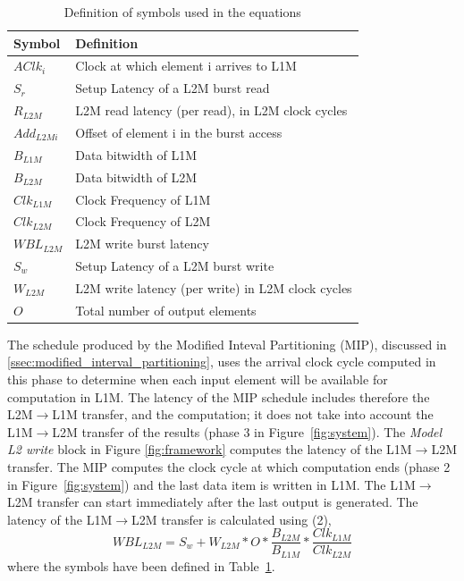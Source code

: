 \begin{table}[]
\centering
\footnotesize
\begin{tabular}{|l|l|}
\hline
\textbf{Symbol} & \textbf{Definition}                                           \\ \hline
$AClk_i$           & Clock at which element i arrives to L1M                \\
$S_r$             & Setup Latency of a L2M burst read                          \\
$R_{L2M}$       & L2M read latency (per read), in L2M clock cycles   \\
$Add_{L2Mi}$     & Offset of element i in the burst access \\
$B_{L1M}$        & Data bitwidth of L1M                                       \\
$B_{L2M}$        & Data bitwidth of L2M                                       \\
$Clk_{L1M}$      & Clock Frequency of L1M                                     \\
$Clk_{L2M}$      & Clock Frequency of L2M                                     \\
$WBL_{L2M}$      & L2M write burst latency                                    \\
$S_w$             & Setup Latency of a L2M burst write                         \\
$W_{L2M}$       & L2M write latency (per write) in L2M clock cycles  \\
$O$                 & Total number of output elements                            \\ \hline
\end{tabular}
\caption{\small Definition of symbols used in the equations}
\label{table:equation}
\end{table}
The schedule produced by the Modified Inteval Partitioning (MIP), discussed in \ref{ssec:modified_interval_partitioning}, uses the arrival clock cycle computed in this phase to determine when each input element will be available for computation in L1M. The latency of the MIP schedule includes therefore the L2M$\rightarrow$L1M transfer, and the computation; it does not take into account the L1M$\rightarrow$L2M transfer of the results (phase 3 in Figure~\ref{fig:system}).
The \textit{Model L2 write} block in Figure \ref{fig:framework} computes the latency of the L1M$\rightarrow$L2M transfer. The MIP computes the clock cycle at which computation ends (phase 2 in Figure~\ref{fig:system}) and the last data item is written in L1M. The L1M$\rightarrow$L2M transfer can start immediately after the last output is generated.
The latency of the L1M$\rightarrow$L2M transfer is calculated using (2),
\begin{equation}
    WBL_{L2M} = S_w + W_{L2M} * O * \frac{B_{L2M}}{B_{L1M}} * \frac{Clk_{L1M}}{Clk_{L2M}}
\end{equation}
where the symbols have been defined in Table~\ref{table:equation}.


